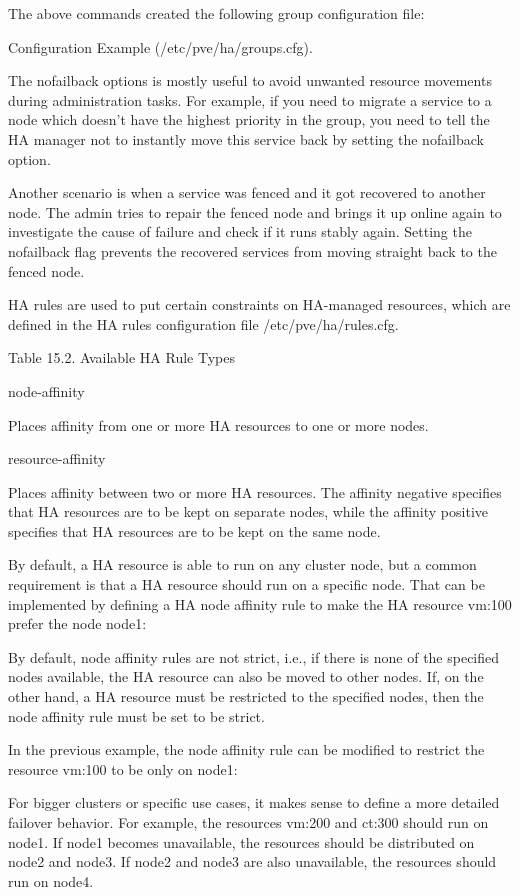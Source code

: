 The above commands created the following group configuration file:

Configuration Example (/etc/pve/ha/groups.cfg).

The nofailback options is mostly useful to avoid unwanted resource movements during administration tasks. For example, if you need to migrate a service to a node which doesn’t have the highest priority in the group, you need to tell the HA manager not to instantly move this service back by setting the nofailback option.

Another scenario is when a service was fenced and it got recovered to another node. The admin tries to repair the fenced node and brings it up online again to investigate the cause of failure and check if it runs stably again. Setting the nofailback flag prevents the recovered services from moving straight back to the fenced node.

HA rules are used to put certain constraints on HA-managed resources, which are defined in the HA rules configuration file /etc/pve/ha/rules.cfg.

Table 15.2. Available HA Rule Types

node-affinity

Places affinity from one or more HA resources to one or more nodes.

resource-affinity

Places affinity between two or more HA resources. The affinity negative specifies that HA resources are to be kept on separate nodes, while the affinity positive specifies that HA resources are to be kept on the same node.

By default, a HA resource is able to run on any cluster node, but a common requirement is that a HA resource should run on a specific node. That can be implemented by defining a HA node affinity rule to make the HA resource vm:100 prefer the node node1:

By default, node affinity rules are not strict, i.e., if there is none of the specified nodes available, the HA resource can also be moved to other nodes. If, on the other hand, a HA resource must be restricted to the specified nodes, then the node affinity rule must be set to be strict.

In the previous example, the node affinity rule can be modified to restrict the resource vm:100 to be only on node1:

For bigger clusters or specific use cases, it makes sense to define a more detailed failover behavior. For example, the resources vm:200 and ct:300 should run on node1. If node1 becomes unavailable, the resources should be distributed on node2 and node3. If node2 and node3 are also unavailable, the resources should run on node4.

